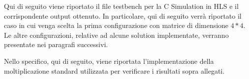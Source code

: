 Qui di seguito viene riportato il file testbench per la C Simulation in HLS e il corrispondente output ottenuto. In particolare, qui di seguito verrà riportato il caso in cui venga scelta la prima configurazione con matrice di dimensione $4*4$. Le altre configurazioni, relative ad alcune solution implementate, verranno presentate nei paragrafi successivi.




Nello specifico, qui di seguito, viene riportata l'implementazione della moltiplicazione standard utilizzata per verificare i risultati sopra allegati.

